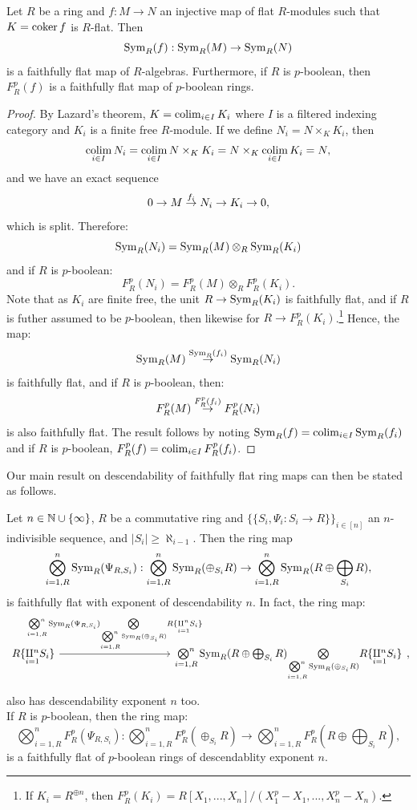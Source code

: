 \begin{proposition}\label{proposition:symformula}
Let $R$ be a ring and $f: M \to N$ an injective map of flat $R$-modules such that $K=\coker{f}$ is $R$-flat. Then 
\[\Sym_R(f): \Sym_R(M) \to \Sym_R(N)\]
is a faithfully flat map of $R$-algebras. Furthermore, if $R$ is $p$-boolean, then $F_R^p(f)$ is a faithfully flat map of $p$-boolean rings.
\end{proposition}
\begin{proof}
By Lazard's theorem, $K=\colim_{i\in I} K_i$ where $I$ is a filtered indexing category and $K_i$ is a finite free $R$-module. If we define $N_i = N \times_{K} K_i$, then
\[\colim_{i \in I} N_i = \colim_{i \in I} N \times_{K} K_i = N \times_{K} \colim_{i \in I} K_i = N,\]
and we have an exact sequence
\[0 \to M \over{f_i}{\to} N_i \to K_i \to 0,\]
which is split. Therefore:
\[\Sym_R(N_i) = \Sym_R(M) \otimes_R \Sym_R(K_i)\]
and if $R$ is $p$-boolean:
\[F^p_R(N_i) = F_R^p(M) \otimes_R F_R^p(K_i).\]
Note that as $K_i$ are finite free, the unit $R \to \Sym_R(K_i)$ is faithfully flat, and if $R$ is futher assumed to be $p$-boolean, then likewise for $R \to F^p_R(K_i)$.\footnote{If $K_i =R^{\oplus n}$, then $F^p_R(K_i) = R[X_1,...,X_n]/(X_1^p-X_1, ..., X_n^p-X_n)$.} Hence, the map:
\[\Sym_R(M) \over{\Sym_R(f_i)}{\to} \Sym_R(N_i)\]
is faithfully flat, and if $R$ is $p$-boolean, then:
\[F^p_R(M) \over{F^p_R(f_i)}{\to} F^p_R(N_i)\]
is also faithfully flat. The result follows by noting $\Sym_R(f) = \colim_{i\in I}\Sym_R(f_i)$ and if $R$ is $p$-boolean, $F^p_R(f) = \colim_{i \in I} F^p_R(f_i)$.
\end{proof}
Our main result on descendability of faithfully flat ring maps can then be stated as follows.
\begin{theorem}\label{theorem:mainindiv}
Let $n \in \bb{N} \cup \{\infty\}$, $R$ be a commutative ring and $\{\{S_i, \Psi_i: S_i \to R\}\}_{i \in [n]}$ an $n$-indivisible sequence, and $|S_i| \ge \aleph_{i-1}$. Then the ring map 
\[\bigotimes_{i=1, R}^n \Sym_R(\Psi_{R,S_i}): \bigotimes_{i=1, R}^n \Sym_R(\oplus_{S_i} R) \to \bigotimes_{i=1, R}^n \Sym_R(R \oplus \bigoplus_{S_i} R),\]
is faithfully flat with exponent of descendability $n$. In fact, the ring map:
\[\begin{tikzcd}R\{\underset{i=1}{\amalg^n}S_i\}\arrow[r, "\underset{i=1,R}{\bigotimes^n} \Sym_R(\Psi_{R,S_i}) \underset{\underset{i=1,R}{\bigotimes^n} \Sym_R(\oplus_{S_i} R)}{\bigotimes}  R\{\underset{i=1}{\amalg^n}S_i\}"] &[8em] \underset{i=1,R}{\bigotimes^n} \Sym_R(R \oplus \bigoplus_{S_i} R)  \underset{\underset{i=1,R}{\bigotimes^n} \Sym_R(\oplus_{S_i} R)}{\bigotimes}R\{\underset{i=1}{\amalg^n}S_i\}\end{tikzcd},\]
also has descendability exponent $n$ too.\\
\indent If $R$ is $p$-boolean, then the ring map:
\[\bigotimes_{i=1, R}^n F^p_R(\Psi_{R,S_i}): \bigotimes_{i=1, R}^n F^p_R(\oplus_{S_i} R) \to \bigotimes_{i=1, R}^n F^p_R(R \oplus \bigoplus_{S_i} R),\]
is a faithfully flat of $p$-boolean rings of descendablity exponent $n$.
\end{theorem}
